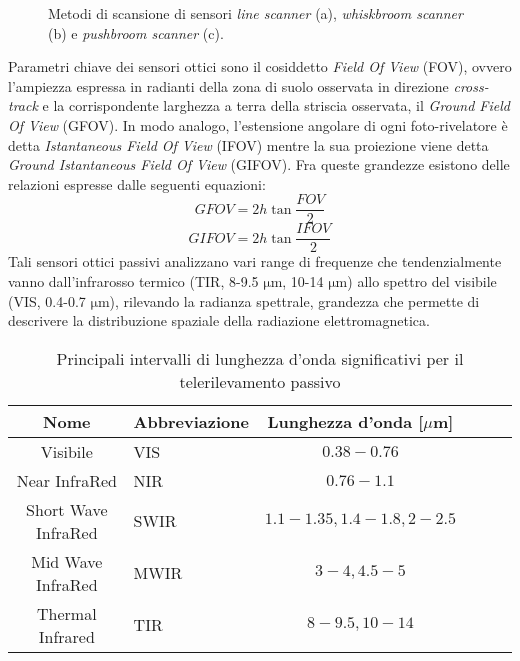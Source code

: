 \clearpage

\begin{figure}[htbp]
\centering
{}
\qquad
{}
\qquad
{}
\qquad
\caption{Metodi di scansione di sensori \emph{line scanner} (a), \emph{whiskbroom scanner} (b) e \emph{pushbroom scanner} (c).}
\end{figure}

Parametri chiave dei sensori ottici sono il cosiddetto \emph{Field Of View} (FOV), ovvero l'ampiezza espressa in radianti della zona di suolo osservata in direzione \emph{cross-track} e la corrispondente larghezza a terra della striscia osservata, il \emph{Ground Field Of View} (GFOV).
In modo analogo, l'estensione angolare di ogni foto-rivelatore è detta \emph{Istantaneous Field Of View} (IFOV) mentre la sua proiezione viene detta \emph{Ground Istantaneous Field Of View} (GIFOV).
Fra queste grandezze esistono delle relazioni espresse dalle seguenti equazioni:
\begin{equation}
GFOV = 2h\tan{\frac{FOV}{2}} 
\end{equation}
\begin{equation}
GIFOV = 2h\tan{\frac{IFOV}{2}}
\end{equation}
Tali sensori ottici passivi analizzano vari range di frequenze che tendenzialmente vanno dall'infrarosso termico (TIR, 8-9.5 $\si{\micro\m}$, 10-14 $\si{\micro\m}$) allo spettro del visibile (VIS, 0.4-0.7 $\si{\micro\m}$), rilevando la radianza spettrale, grandezza che permette di descrivere la distribuzione spaziale della radiazione elettromagnetica. 

\begin{table}
\caption{Principali intervalli di lunghezza d'onda significativi per il telerilevamento passivo}
\center
\begin{tabular}{cp{3cm}cp{5cm}cp{5cm}}
Nome							&Abbreviazione	&Lunghezza d'onda [$\mu$m]\\ \hline
Visibile							&VIS						&$0.38-0.76$\\ 
Near InfraRed				&NIR						&$0.76-1.1$\\
Short Wave InfraRed	&SWIR					&$1.1-1.35, 1.4-1.8, 2-2.5$\\
Mid Wave InfraRed		&MWIR					&$3-4, 4.5-5$\\
Thermal Infrared			&TIR						&$8-9.5, 10-14$\\
\end{tabular}
\end{table}

